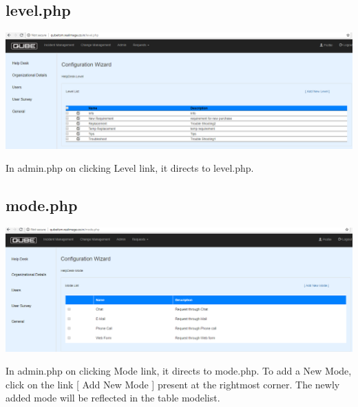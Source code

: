 \documentclass{article}
\begin{document}
\subsection{level.php}
\begin{center}

    \includegraphics[width=7.0in]{level.png}
   
    \label{}

\end{center}
In admin.php on clicking Level link, it directs to level.php. 
\subsection{mode.php}
\begin{center}

    \includegraphics[width=7.0in]{mode.png}
   
    \label{}

\end{center}
In admin.php on clicking Mode link, it directs to mode.php. To add a New Mode, click on the link [ Add New Mode ] present at the rightmost corner. The newly added mode will be reflected in the table modelist.
\end{document}
